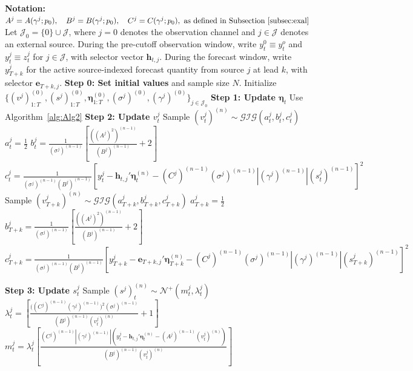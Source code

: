 \documentclass[APA,STIX1COL]{WileyNJD-v2}
\begin{document}
\begin{algorithm}
\caption{MCMC Algorithm}\label{alg1}
\begin{algorithmic}

\State \textbf{Notation:}
\State  \(
A^j = A(\gamma^j;p_0), \quad B^j = B(\gamma^j;p_0), \quad C^j = C(\gamma^j;p_0), \text{ as defined in Subsection~\ref{subsec:exal}}
\)
\State Let \(\mathcal{J}_0=\{0\}\cup\mathcal{J}\), where \(j=0\) denotes the observation channel and \(j\in\mathcal{J}\) denotes an external source. During the pre-cutoff observation window, write \(y_t^0 \equiv y_t^o\) and \(y_t^j \equiv z_t^j\) for \(j\in\mathcal{J}\), with selector vector \(\mathbf{h}_{t,j}\). During the forecast window, write \(y_{T+k}^{j}\) for the active source-indexed forecast quantity from source \(j\) at lead \(k\), with selector \(\mathbf{e}_{T+k,j}\).
\State \textbf{Step 0: Set initial values} and sample size $N$.
\State Initialize $\{(v^j)^{(0)}_{1:T}, (s^j)^{(0)}_{1:T}, \boldsymbol{\eta}^{(0)}_{1:T}, (\sigma^j)^{(0)}, (\gamma^j)^{(0)}\}_{j\in\mathcal{J}_0}$
    \State \textbf{Step 1: Update $\boldsymbol{\eta}_t$}
    \State Use Algorithm~\ref{alg:Alg2}
        \State \textbf{Step 2: Update $v^j_t$}
            \State Sample $(v^j_t)^{(n)} \sim \mathcal{GIG}(a^j_t, b^j_t, c^j_t)$
            \State $a^j_t = \frac{1}{2}$
            \State $b^j_t = \frac{1}{(\sigma^j)^{(n-1)}}\left[ \frac{((A^j)^2)^{(n-1)}}{(B^j)^{(n-1)}}+2\right]$
            \State $c^j_t = \frac{1}{(\sigma^j)^{(n-1)} (B^j)^{(n-1)}}\left[y_t^j -\mathbf{h}_{t,j}' \boldsymbol{\eta}^{(n)}_t -(C^j)^{(n-1)} (\sigma^j)^{(n-1)} |(\gamma^j)^{(n-1)}| (s^j_t)^{(n-1)} \right]^2$
        \EndFor
            \State Sample $(v^j_{T+k})^{(n)} \sim \mathcal{GIG}(a^j_{T+k}, b^j_{T+k}, c^j_{T+k})$
            \State $a^j_{T+k} = \frac{1}{2}$
            \State $b^j_{T+k} = \frac{1}{(\sigma^j)^{(n-1)}}\left[ \frac{((A^j)^2)^{(n-1)}}{(B^j)^{(n-1)}}+2\right]$
            \State $c^j_{T+k} = \frac{1}{(\sigma^j)^{(n-1)} (B^j)^{(n-1)}}\left[y_{T+k}^j -\mathbf{e}_{T+k,j}' \boldsymbol{\eta}^{(n)}_{T+k} -(C^j)^{(n-1)} (\sigma^j)^{(n-1)} |(\gamma^j)^{(n-1)}| (s^j_{T+k})^{(n-1)} \right]^2$
        \EndFor
        \EndIf

        \State \textbf{Step 3: Update $s^j_t$}
            \State Sample $(s^j)^{(n)}_t \sim \mathcal{N}^+(m^j_t, \lambda^j_t)$
            \State $\lambda^j_t =  \left[\frac{\big((C^j)^{(n-1)}(\gamma^j)^{(n-1)} \big)^2(\sigma^j)^{(n-1)}}{(B^j)^{(n-1)}(v^j_t)^{(n)}}+1\right]$
            \State $m^j_t =  \lambda^j_t \left[\frac{(C^j)^{(n-1)}|(\gamma^j)^{(n-1)}|(y_t^j -\mathbf{h}_{t,j}' \boldsymbol{\eta}^{(n)}_t - (A^j)^{(n-1)} (v^j_t)^{(n)})}{(B^j)^{(n-1)}(v^j_t)^{(n)}}\right]$
        \EndFor


\end{algorithmic}
\end{algorithm}
\end{document}
